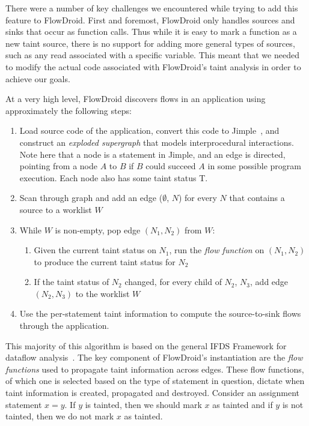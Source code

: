 There were a number of key challenges we encountered while trying to add this feature to FlowDroid. First and foremost, FlowDroid only handles sources and sinks that occur as function calls. Thus while it is easy to mark a function as a new taint source, there is no support for adding more general types of sources, such as any read associated with a specific variable. This meant that we needed to modify the actual code associated with FlowDroid's taint analysis in order to achieve our goals.

At a very high level, FlowDroid discovers flows in an application using approximately the following steps:
\begin{enumerate}
\item Load source code of the application, convert this code to Jimple~\cite{soot}, and construct an \emph{exploded supergraph} that models interprocedural interactions. Note here that a node is a statement in Jimple, and an edge is directed, pointing from a node $A$ to $B$ if $B$ could succeed $A$ in some possible program execution. Each node also has some taint status T.
\item Scan through graph and add an edge ($\emptyset$, $N$) for every $N$ that contains a source to a worklist $W$
\item While $W$ is non-empty, pop edge $(N_1, N_2)$ from $W$:
\begin{enumerate}
\item Given the current taint status on $N_1$, run the \emph{flow function} on $(N_1, N_2)$ to produce the current taint status for $N_2$
\item If the taint status of $N_2$ changed, for every child of $N_2$, $N_3$, add edge $(N_2, N_3)$ to the worklist $W$
\end{enumerate}
\item Use the per-statement taint information to compute the source-to-sink flows through the application.
\end{enumerate}

This majority of this algorithm is based on the general IFDS Framework for dataflow analysis~\cite{ifds}. The key component of FlowDroid's instantiation are the \emph{flow functions} used to propagate taint information across edges. These flow functions, of which one is selected based on the type of statement in question, dictate when taint information is created, propagated and destroyed. Consider an assignment statement $x = y$. If $y$ is tainted, then we should mark $x$ as tainted and if $y$ is not tainted, then we do not mark $x$ as tainted. 

